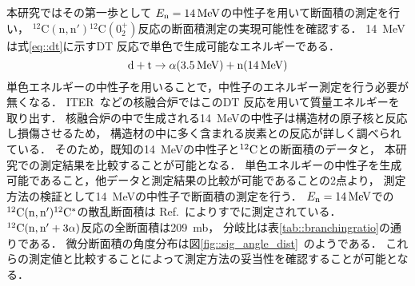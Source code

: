 \documentclass[../master]{subfiles}
\begin{document}
本研究ではその第一歩として
$E_{\rm n} = \SI{14}{\mega\electronvolt}$の中性子を用いて断面積の測定を行い，
${}^{12}\mathrm{C}(\mathrm{n},\mathrm{n}'){}^{12}\mathrm{C} (0_2^+)$反応の断面積測定の実現可能性を確認する．
\SI{14}{\mega\electronvolt}は式\eqref{eq::dt}に示すDT 反応で単色で生成可能なエネルギーである．
\begin{equation}
  {\rm d} + {\rm t} \rightarrow \alpha (\SI{3.5}{\mega\electronvolt}) + {\rm n} (\SI{14}{\mega\electronvolt})
  \label{eq::dt}
\end{equation}
単色エネルギーの中性子を用いることで，中性子のエネルギー測定を行う必要が無くなる．
ITER~\cite{iter}などの核融合炉ではこのDT 反応を用いて質量エネルギーを取り出す．
核融合炉の中で生成される\SI{14}{\mega\electronvolt}の中性子は構造材の原子核と反応し損傷させるため，
構造材の中に多く含まれる炭素との反応が詳しく調べられている．
そのため，既知の\SI{14}{\mega\electronvolt}の中性子と${}^{12}{\rm C}$との断面積のデータと，
本研究での測定結果を比較することが可能となる．
単色エネルギーの中性子を生成可能であること，他データと測定結果の比較が可能であることの2点より，
測定方法の検証として\SI{14}{\mega\electronvolt}の中性子で断面積の測定を行う．
$E_{\rm n}=\SI{14}{\mega\electronvolt}$での${}^{12}{\rm C}({\rm n},{\rm n}'){}^{12}{\rm C}^{*}$の散乱断面積は
Ref.~\cite{takahashietal,kondoetal}によりすでに測定されている．
${}^{12}{\rm C}({\rm n},{\rm n}'+3\alpha)$反応の全断面積は\SI{209}{\milli\barn}，
分岐比は表\ref{tab::branchingratio}の通りである．
微分断面積の角度分布は図\ref{fig::sig_angle_dist}~\cite{kondoetal}のようである．
これらの測定値と比較することによって測定方法の妥当性を確認することが可能となる．
\end{document}
